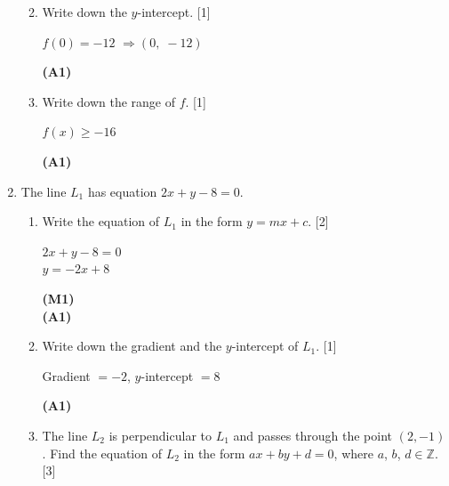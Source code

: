 \documentclass[12pt, twoside]{article}
\begin{document}
\begin{enumerate}[itemsep=0.2cm]
\begin{enumerate}[itemsep=0.3cm]
  \medskip
  \item Write down the $y$-intercept. \hfill [1]

  \begin{minipage}[t]{0.62\textwidth}
  $f(0) = -12$ \quad $\Rightarrow (0,\; -12)$
  \end{minipage}%
  \begin{minipage}[t]{0.35\textwidth}\raggedleft
  \textbf{(A1)}
  \end{minipage}

  \medskip
  \item Write down the range of $f$. \hfill [1]

  \begin{minipage}[t]{0.62\textwidth}
  $f(x) \geq -16$
  \end{minipage}%
  \begin{minipage}[t]{0.35\textwidth}\raggedleft
  \textbf{(A1)}
  \end{minipage}
\end{enumerate}

\newpage

\item The line $L_1$ has equation $2x + y - 8 = 0$.

\begin{enumerate}[itemsep=0.3cm]
  \item Write the equation of $L_1$ in the form $y = mx + c$. \hfill [2]

  \begin{minipage}[t]{0.62\textwidth}
  $2x + y - 8 = 0$\\[0.15cm]
  $y = -2x + 8$
  \end{minipage}%
  \begin{minipage}[t]{0.35\textwidth}\raggedleft
  \textbf{(M1)}\\[0.15cm]
  \textbf{(A1)}
  \end{minipage}

  \medskip
  \item Write down the gradient and the $y$-intercept of $L_1$. \hfill [1]

  \begin{minipage}[t]{0.62\textwidth}
  Gradient $= -2$, \quad $y$-intercept $= 8$
  \end{minipage}%
  \begin{minipage}[t]{0.35\textwidth}\raggedleft
  \textbf{(A1)}
  \end{minipage}

  \medskip
  \item The line $L_2$ is perpendicular to $L_1$ and passes through the
        point $(2, -1)$. Find the equation of $L_2$ in the form
        $ax + by + d = 0$, where $a$, $b$, $d \in \mathbb{Z}$. \hfill [3]


\end{enumerate}
\end{enumerate}
\end{document}
